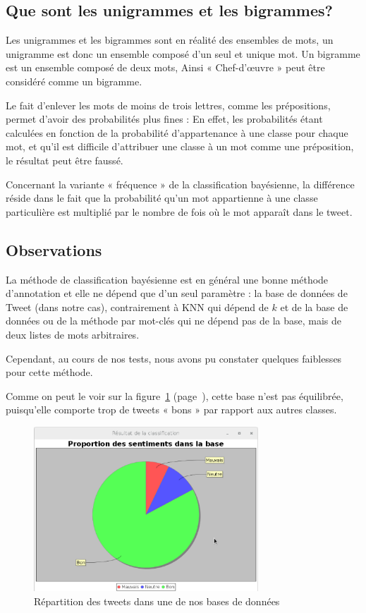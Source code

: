 \documentclass[12pt,a4paper]{report}
\begin{document}
\subsection{Que sont les unigrammes et les bigrammes?}
Les unigrammes et les bigrammes sont en réalité des ensembles de mots, un
unigramme est donc un ensemble composé d'un seul et unique mot. Un bigramme est
un ensemble composé de deux mots, Ainsi « Chef-d'œuvre » peut être considéré
comme un bigramme.

Le fait d'enlever les mots de moins de trois lettres, comme les prépositions,
permet d'avoir des probabilités plus fines : En effet, les probabilités étant
calculées en fonction de la probabilité d'appartenance à une classe pour chaque
mot, et qu'il est difficile d'attribuer une classe à un mot comme une
préposition, le résultat peut être faussé.

Concernant la variante « fréquence » de la classification bayésienne, la
différence réside dans le fait que la probabilité qu'un mot appartienne à une
classe particulière est multiplié par le nombre de fois où le mot apparaît dans
le tweet.

\subsection{Observations}
La méthode de classification bayésienne est en général une bonne méthode
d'annotation et elle ne dépend que d'un seul paramètre : la base de données de
Tweet (dans notre cas), contrairement à KNN qui dépend de $k$ et de la base de
données ou de la méthode par mot-clés qui ne dépend pas de la base, mais de deux
listes de mots arbitraires.

Cependant, au cours de nos tests, nous avons pu constater quelques faiblesses
pour cette méthode.

Comme on peut le voir sur la figure~\ref{capture_repartition_tweetsv7}
(page~\pageref{capture_repartition_tweetsv7}), cette
base n'est pas équilibrée, puisqu'elle comporte trop de tweets « bons » par
rapport aux autres classes.

\begin{figure}
	\centering
	\includegraphics[width=0.75\textwidth]{img/resultats_classification_tweetsv7.eps}
	\caption{Répartition des tweets dans une de nos bases de données}
	\label{capture_repartition_tweetsv7}
\end{figure}
\end{document}
